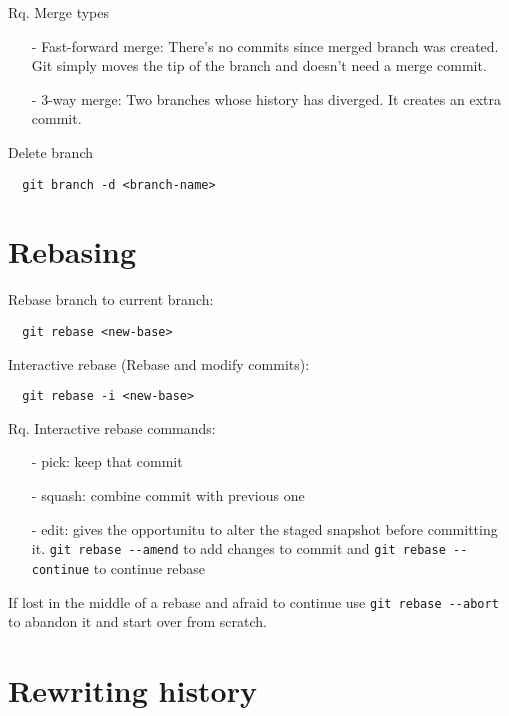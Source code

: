 \documentclass[french]{article}
\begin{document}
Rq. Merge types
\begin{itemize}
  \item [-] Fast-forward merge: There's no commits since merged branch was created. Git simply moves the tip of the branch and doesn't need a merge commit.
  \item [-] 3-way merge: Two branches whose history has diverged. It creates an extra commit.
\end{itemize}$ $\\

Delete branch
\begin{verbatim}
  git branch -d <branch-name>
\end{verbatim}

\section{Rebasing}

Rebase branch to current branch:
\begin{verbatim}
  git rebase <new-base>
\end{verbatim}

Interactive rebase (Rebase and modify commits):
\begin{verbatim}
  git rebase -i <new-base>
\end{verbatim}

Rq. Interactive rebase commands:
\begin{itemize}
  \item [-] pick: keep that commit
  \item [-] squash: combine commit with previous one
  \item [-] edit: gives the opportunitu to alter the staged snapshot before committing it. \verb|git rebase --amend| to add changes to commit and \verb|git rebase --continue| to continue rebase
\end{itemize}
If lost in the middle of a rebase and afraid to continue use \verb|git rebase --abort| to abandon it and start over from scratch.
$ $\\

\section{Rewriting history}
\end{document}
